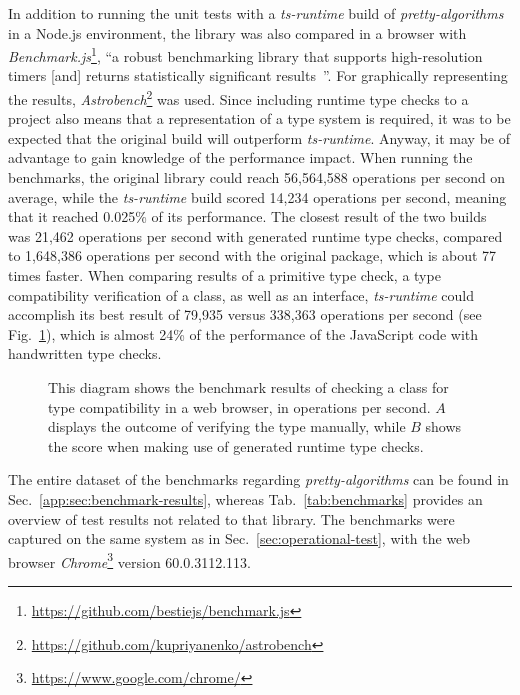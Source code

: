 In addition to running the unit tests with a \emph{ts-runtime} build of \emph{pretty-algorithms} in a Node.js environment, the library was also compared in a browser with \emph{Benchmark.js}\footnote{\url{https://github.com/bestiejs/benchmark.js}}, ``a robust benchmarking library that supports high-resolution timers [and] returns statistically significant results~\cite{Evaluation:benchmarkjs}''. For graphically representing the results, \emph{Astrobench}\footnote{\url{https://github.com/kupriyanenko/astrobench}} was used. Since including runtime type checks to a project also means that a representation of a type system is required, it was to be expected that the original build will outperform \emph{ts-runtime}. Anyway, it may be of advantage to gain knowledge of the performance impact. When running the benchmarks, the original library could reach 56,564,588 operations per second on average, while the \emph{ts-runtime} build scored 14,234 operations per second, meaning that it reached 0.025\% of its performance. The closest result of the two builds was 21,462 operations per second with generated runtime type checks, compared to 1,648,386 operations per second with the original package, which is about 77 times faster. When comparing results of a primitive type check, a type compatibility verification of a class, as well as an interface, \emph{ts-runtime} could accomplish its best result of 79,935 versus 338,363 operations per second (see Fig.~\ref{fig:benchmark}), which is almost 24\% of the performance of the JavaScript code with handwritten type checks.
\begin{figure}
\centering

\caption{This diagram shows the benchmark results of checking a class for type compatibility in a web browser, in operations per second. $A$ displays the outcome of verifying the type manually, while $B$ shows the score when making use of generated runtime type checks.}
\label{fig:benchmark}
\end{figure}
The entire dataset of the benchmarks regarding \emph{pretty-algorithms} can be found in Sec.~\ref{app:sec:benchmark-results}, whereas Tab.~\ref{tab:benchmarks} provides an overview of test results not related to that library. The benchmarks were captured on the same system as in Sec.~\ref{sec:operational-test}, with the web browser \emph{Chrome}\footnote{\url{https://www.google.com/chrome/}} version 60.0.3112.113.
